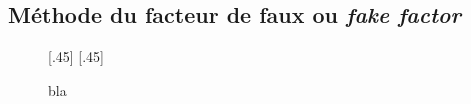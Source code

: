 \subsection{Méthode du facteur de faux ou \emph{fake factor}}\label{chapter-HTT_analysis-section-bg_estimation-FF_method}


\begin{figure}
\centering

[.45\textwidth]
{}
\hfill
{}[.45\textwidth]
{}

\caption{bla}
\end{figure}